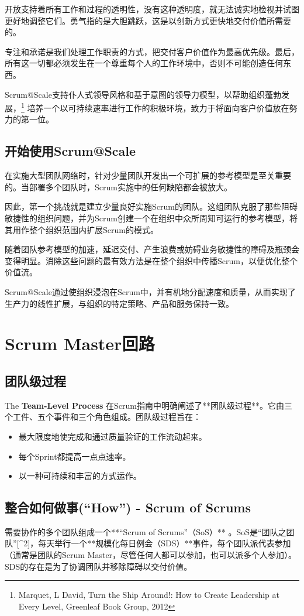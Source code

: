 \documentclass[12pt,a4paper,parskip=full]{scrartcl}
\begin{document}
\begin{CJK*}{UTF8}{gbsn}
开放支持着所有工作和过程的透明性，没有这种透明度，就无法诚实地检视并试图更好地调整它们。勇气指的是大胆跳跃，这是以创新方式更快地交付价值所需要的。

专注和承诺是我们处理工作职责的方式，把交付客户价值作为最高优先级。最后，所有这一切都必须发生在一个尊重每个人的工作环境中，否则不可能创造任何东西。

Scrum@Scale支持仆人式领导风格和基于意图的领导力模型，以帮助组织蓬勃发展，\footnote{Marquet, L
David, Turn the Ship Around!: How to Create Leadership at Every Level,
Greenleaf Book Group, 2012} 培养一个以可持续速率进行工作的积极环境，致力于将面向客户价值放在努力的第一位。

\subsection{开始使用Scrum@Scale}
在实施大型团队网络时，针对少量团队开发出一个可扩展的参考模型是至关重要的。当部署多个团队时，Scrum实施中的任何缺陷都会被放大。

因此，第一个挑战就是建立少量良好实施Scrum的团队。这组团队克服了那些阻碍敏捷性的组织问题，并为Scrum创建一个在组织中众所周知可运行的参考模型，将其用作整个组织范围内扩展Scrum的模式。

随着团队参考模型的加速，延迟交付、产生浪费或妨碍业务敏捷性的障碍及瓶颈会变得明显。消除这些问题的最有效方法是在整个组织中传播Scrum，以便优化整个价值流。

Scrum@Scale通过使组织浸泡在Scrum中，并有机地分配速度和质量，从而实现了生产力的线性扩展，与组织的特定策略、产品和服务保持一致。

\section{Scrum Master回路}
\subsection{团队级过程}
The \textbf{Team-Level Process} 在Scrum指南中明确阐述了**团队级过程**。它由三个工件、五个事件和三个角色组成。团队级过程旨在：
\begin{itemize}
\item 最大限度地使完成和通过质量验证的工作流动起来。
\item 每个Sprint都提高一点点速率。
\item 以一种可持续和丰富的方式运作。
\end{itemize}

\subsection{整合如何做事(“How”) - Scrum of Scrums}
需要协作的多个团队组成一个**“Scrum of Scrums”（SoS）** 。SoS是“团队之团队”[^2]，每天举行一个**规模化每日例会（SDS）**事件，每个团队派代表参加（通常是团队的Scrum Master，尽管任何人都可以参加，也可以派多个人参加）。SDS的存在是为了协调团队并移除障碍以交付价值。


\end{CJK*}
\end{document}
